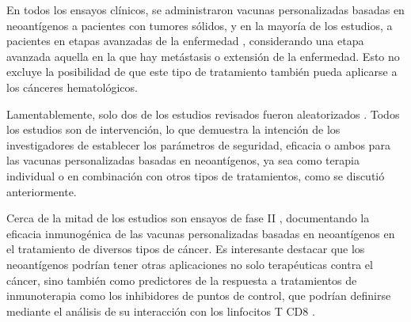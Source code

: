 En todos los ensayos clínicos, se administraron vacunas personalizadas basadas en neoantígenos a pacientes con tumores sólidos, y en la mayoría de los estudios, a pacientes en etapas avanzadas de la enfermedad \citep{cheng2021bertmhc,cafri2020mrna,awad2022personalized,ott2020phase,palmer2022individualized,yu2023preliminary,holm2022neoantigen,mueller2022mass,ellingsen2022characterization,shou2022combination,aggarwal2019immunotherapy,poran2020combined,dillman2018randomized}, considerando una etapa avanzada aquella en la que hay metástasis o extensión de la enfermedad. Esto no excluye la posibilidad de que este tipo de tratamiento también pueda aplicarse a los cánceres hematológicos.


Lamentablemente, solo dos de los estudios revisados fueron aleatorizados \citep{rocconi2022proof,dillman2018randomized}. Todos los estudios son de intervención, lo que demuestra la intención de los investigadores de establecer los parámetros de seguridad, eficacia o ambos para las vacunas personalizadas basadas en neoantígenos, ya sea como terapia individual o en combinación con otros tipos de tratamientos, como se discutió anteriormente.

Cerca de la mitad de los estudios son ensayos de fase II \citep{cheng2021bertmhc, cafri2020mrna, cai2021personalized, yu2023preliminary, holm2022neoantigen, mueller2022mass, ellingsen2022characterization, aggarwal2019immunotherapy, kloor2020frameshift, podaza2020evaluation, sater2020neoadjuvant, dillman2018randomized}, documentando la eficacia inmunogénica de las vacunas personalizadas basadas en neoantígenos en el tratamiento de diversos tipos de cáncer. Es interesante destacar que los neoantígenos podrían tener otras aplicaciones no solo terapéuticas contra el cáncer, sino también como predictores de la respuesta a tratamientos de inmunoterapia como los inhibidores de puntos de control, que podrían definirse mediante el análisis de su interacción con los linfocitos T CD8 \citep{holm2022neoantigen}.


